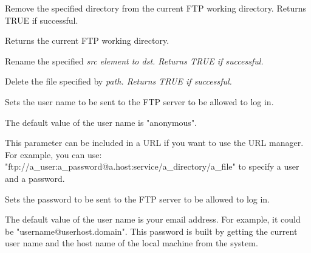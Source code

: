 Remove the specified directory from the current FTP working directory.
Returns TRUE if successful.



Returns the current FTP working directory.




Rename the specified \it{src} element to \it{dst}. Returns TRUE if successful.




Delete the file specified by \it{path}. Returns TRUE if successful.



Sets the user name to be sent to the FTP server to be allowed to log in.


The default value of the user name is "anonymous".


This parameter can be included in a URL if you want to use the URL manager.
For example, you can use: "ftp://a_user:a_password@a.host:service/a_directory/a_file"
to specify a user and a password.


Sets the password to be sent to the FTP server to be allowed to log in.


The default value of the user name is your email address. For example, it could
be "username@userhost.domain". This password is built by getting the current
user name and the host name of the local machine from the system.



